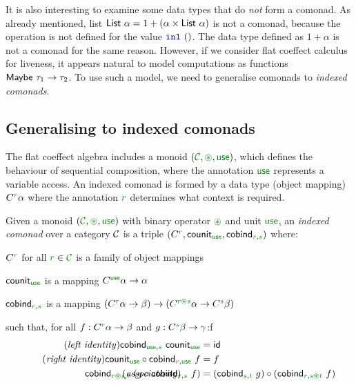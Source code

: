It is also interesting to examine some data types that do \emph{not} form a comonad. As already
mentioned, list $\ident{List}~\alpha = 1 + (\alpha \times \ident{List}~\alpha)$ is not a comonad,
because the  operation is not defined for the value $\kvd{inl}~()$. The  
data type defined as $1 + \alpha$ is not a comonad for the same reason. However, if we consider 
flat coeffect calculus for liveness, it appears natural to model computations as functions 
$\textnormal{\sffamily Maybe}~\tau_1 \rightarrow \tau_2$. To use such a model, we need to generalise comonads 
to \emph{indexed comonads}.


\subsection{Generalising to indexed comonads}
\label{sec:flat-semantics-idx}

The flat coeffect algebra includes a monoid $(\C, \cseq, \cunit)$, which defines the behaviour of
sequential composition, where the annotation $\cunit$ represents a variable access. An indexed 
comonad is formed by a data type (object mapping) $\ctyp{\cclrd{r}}{\alpha}$ where the annotation 
$\cclrd{r}$ determines what context is required. 

\begin{definition}
Given a monoid $(\C, \cseq, \cunit)$ with binary operator $\cseq$ and unit $\cunit$, an 
\emph{indexed comonad} over a category $\mathcal{C}$ is a triple 
$(\ctyp{\cclrd{r}{}}, \ident{counit}_{\cunit}, \ident{cobind}_{\cclrd{r}, \cclrd{s}})$ where:

\begin{compactitem}
\item $\ctyp{\cclrd{r}}{}$ for all $\cclrd{r} \in \C$ is a family of object mappings 
\item $\ident{counit}_{\cunit}$ is a mapping $\ctyp{\cunit}{\alpha} \rightarrow \alpha$ 
\item $\ident{cobind}_{\cclrd{r}, \cclrd{s}}$ is a mapping $(\ctyp{\cclrd{r}}{\alpha} \rightarrow \beta) 
  \rightarrow (\ctyp{\cclrd{r}\cseq\cclrd{s}}{\alpha} \rightarrow \ctyp{\cclrd{s}}{\beta})$
\end{compactitem}
such that, for all $f:\ctyp{\cclrd{r}}{\alpha} \rightarrow \beta$ and $g:\ctyp{\cclrd{s}}{\beta} \rightarrow \gamma$:f
\begin{align}
\tag{\emph{left identity}}
  \ident{cobind}_{\cunit, \cclrd{s}}~\ident{counit}_{\cunit} &= \idf{}
  \\
\tag{\emph{right identity}}
  \ident{counit}_{\cunit} \circ \ident{cobind}_{\cclrd{r}, \cunit}~f &= f
  \\
\tag{\emph{associativity}}
\hspace{-10em}
  \ident{cobind}_{\cclrd{r}\cseq\cclrd{s},\cclrd{t}}~(g \circ \ident{cobind}_{\cclrd{r}, \cclrd{s}}~f) &= 
    (\ident{cobind}_{\cclrd{s}, \cclrd{t}}~g) \circ (\ident{cobind}_{\cclrd{r}, \cclrd{s}\cseq\cclrd{t}}~f)
\end{align}
\end{definition}

